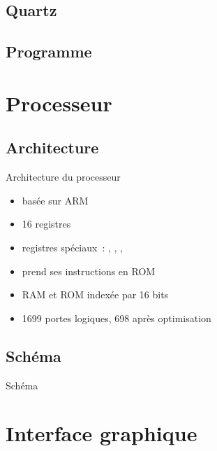 \documentclass[11pt]{beamer}
\begin{document}
\subsection{Quartz}

\subsection{Programme}



\section{Processeur}

\subsection{Architecture}

\begin{frame}{Architecture du processeur}

\begin{itemize}
\item basée sur ARM
\item 16 registres
\item registres spéciaux~: , , , 
\item prend ses instructions en ROM
\item RAM et ROM indexée par 16 bits
\item 1699 portes logiques, \alert{698} après optimisation
\end{itemize}

\end{frame}

\subsection{Schéma}

\begin{frame}{Schéma}

\end{frame}

\section{Interface graphique}
\end{document}
